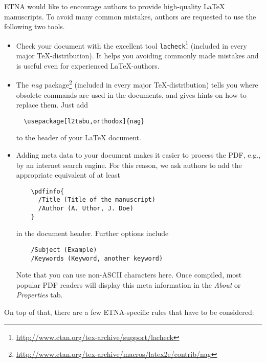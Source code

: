 \documentclass[parskip=half]{scrartcl}
\begin{document}
ETNA would like to encourage authors to provide high-quality \LaTeX{}
manuscripts. To avoid many common mistakes, authors are requested to use the
following two tools.
\begin{itemize}
\item Check your document with the excellent tool
  \verb|lacheck|\footnote{\url{http://www.ctan.org/tex-archive/support/lacheck}}
  (included in every major \TeX{}-dis\-tri\-bu\-tion). It helps you avoiding commonly
  made mistakes and is useful even for experienced \LaTeX{}-authors.

\item The \emph{nag}
  package\footnote{\url{http://www.ctan.org/tex-archive/macros/latex2e/contrib/nag}}
  (included in every major \TeX-distribution) tells you where obsolete commands
  are used in the documents, and gives hints on how to replace them. Just add
  \begin{verbatim}
  \usepackage[l2tabu,orthodox]{nag}
  \end{verbatim}
  to the header of your \LaTeX{} document.

\item Adding meta data to your document makes it easier to process the
  PDF, e.g., by an internet search engine. For this reason, we ask authors to
  add the appropriate equivalent of at least
  \begin{verbatim}
    \pdfinfo{
      /Title (Title of the manuscript)
      /Author (A. Uthor, J. Doe)
    }
  \end{verbatim}
  in the document header. Further options include
  \begin{verbatim}
    /Subject (Example)
    /Keywords (Keyword, another keyword)
  \end{verbatim}
  Note that you can use non-ASCII characters here.
  Once compiled, most popular PDF readers will display this meta information in
  the \emph{About} or \emph{Properties} tab.
\end{itemize}

On top of that, there are a few ETNA-specific rules that have to be considered:
\end{document}
